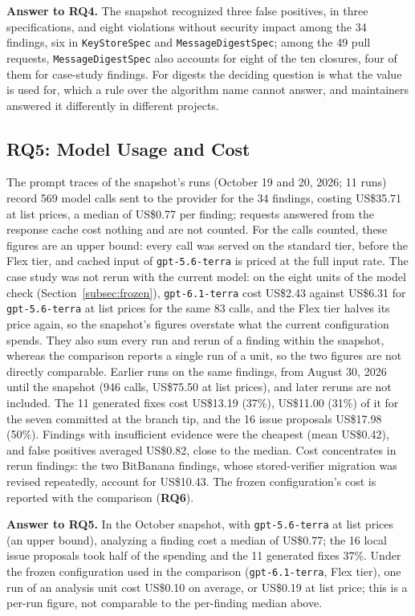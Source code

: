 \documentclass[conference]{IEEEtran}
\newcommand{\researchq}[1]{\textbf{RQ#1}}
\begin{document}
\textbf{Answer to \researchq{4}.} The snapshot recognized three false
positives, in three specifications, and eight violations without security
impact among the 34 findings, six in \texttt{KeyStoreSpec} and
\texttt{MessageDigestSpec}; among the 49 pull requests,
\texttt{MessageDigestSpec} also accounts for eight of the ten closures, four of
them for case-study findings. For digests the
deciding question is what the value is used for, which a rule over the
algorithm name cannot answer, and maintainers answered it differently in
different projects.

\subsection{\researchq{5}: Model Usage and Cost}

The prompt traces of the snapshot's runs (October 19 and 20, 2026;
11 runs) record 569 model calls sent to the provider for the 34 findings,
costing US\$35.71 at list prices, a median of US\$0.77 per
finding; requests
answered from the response cache cost nothing and are not counted. For the
calls counted, these figures are an upper bound: every call was served on the standard tier,
before the Flex tier, and cached input of \texttt{gpt-5.6-terra} is priced at
the full input rate. The case study was not rerun with the current model: on the
eight units of the model check (Section~\ref{subsec:frozen}),
\texttt{gpt-6.1-terra} cost US\$2.43 against US\$6.31 for \texttt{gpt-5.6-terra}
at list prices for the same 83 calls, and the Flex tier halves its price again,
so the snapshot's figures overstate what the current configuration spends. They
also sum every run and rerun of a finding within the snapshot, whereas the
comparison reports a single run of a unit, so the two figures are not directly
comparable. Earlier runs on the same findings, from August 30, 2026 until the
snapshot (946 calls, US\$75.50 at list prices), and later reruns are not
included. The 11 generated fixes cost US\$13.19 (37\%), US\$11.00 (31\%) of it
for the seven committed at the branch tip, and the 16 issue proposals
US\$17.98 (50\%). Findings with insufficient evidence were the cheapest (mean
US\$0.42), and false positives averaged US\$0.82, close to the median. Cost
concentrates in rerun findings: the two BitBanana findings, whose
stored-verifier migration was revised repeatedly, account for US\$10.43. The frozen configuration's
cost is reported with the comparison (\researchq{6}).

\textbf{Answer to \researchq{5}.} In the October snapshot, with
\texttt{gpt-5.6-terra} at list prices (an upper bound), analyzing a finding
cost a median of US\$0.77; the 16 local issue proposals took half of the
spending and the 11 generated fixes 37\%. Under the
frozen configuration used in the comparison (\texttt{gpt-6.1-terra}, Flex
tier), one run of an analysis unit cost US\$0.10 on average, or US\$0.19 at
list price; this is a per-run figure, not comparable to the per-finding median
above.
\end{document}
